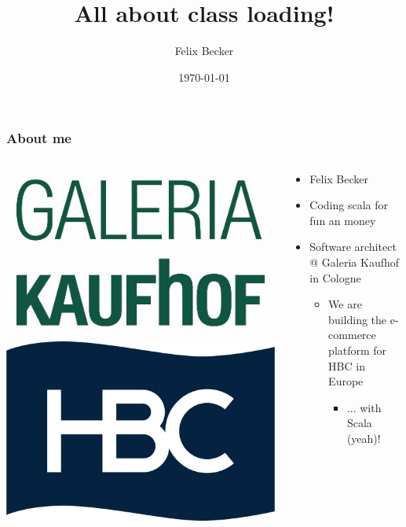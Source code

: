 \documentclass[aspectratio=169]{beamer}
\title{All about class loading!}
\author{Felix Becker}
\date{\today}
\institute{Amsterdam.scala}
\begin{document}
\maketitle

\begin{frame}
	\frametitle{About me}
	\begin{columns}[T] 
		\begin{column}{.20\textwidth}
			\includegraphics[scale=0.16]{assets/kaufhof}
			\\
			\includegraphics[scale=0.06]{assets/hbc}
		\end{column}
		\hfill
		\begin{column}{.80\textwidth}
			\begin{itemize}
				\item{Felix Becker}
				\item{Coding scala for fun an money}
				\item{Software architect @ Galeria Kaufhof in Cologne}
				\begin{itemize}
					\item{We are building the e-commerce platform for HBC in Europe}
					\begin{itemize}
						\item{... with Scala (yeah)!}
					\end{itemize}
				\end{itemize}
			\end{itemize}
		\end{column}
	\end{columns}
\end{frame}
\end{document}
